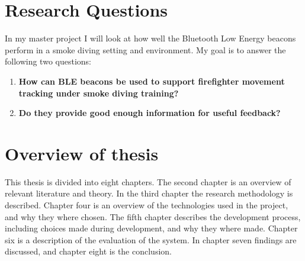 \documentclass[../Main/thesis.tex]{subfiles}
\begin{document}
\section{Research Questions}
\label{ch:reserch_questions}
In my master project I will look at how well the Bluetooth Low Energy beacons perform in a smoke diving setting and environment. 
My goal is to answer the following two questions:

\begin{enumerate}
	\item \textbf{How can BLE beacons be used to support firefighter movement tracking under smoke diving training?}
	\item \textbf{Do they provide good enough information for useful feedback?}
\end{enumerate}


\section{Overview of thesis}
This thesis is divided into eight chapters.
The second chapter is an overview of relevant literature and theory.
In the third chapter the research methodology is described.
Chapter four is an overview of the technologies used in the project, and why they where chosen.
The fifth chapter describes the development process, including choices made during development, and why they where made. 
Chapter six is a description of the evaluation of the system.
In chapter seven findings are discussed, and chapter eight is the conclusion.


\blankpage

\onlyinsubfile{}
\onlyinsubfile{}
\end{document}
